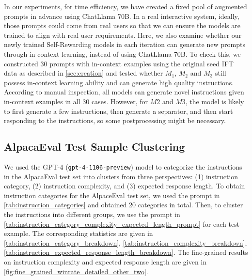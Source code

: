 \documentclass{article}
\begin{document}
In our experiments, for time efficiency, we have created a fixed pool of augmented prompts in advance using ChatLlama 70B. In a real interactive system, ideally, those prompts could come from real users so that we can ensure the models are trained to align with real user requirements. Here, we also examine whether  our newly trained Self-Rewarding models in each iteration can generate new prompts through in-context learning, instead of using ChatLlama 70B.
To check this, we constructed 30 prompts with in-context examples using the original seed IFT data as described in \autoref{sec:creation} and tested whether $M_1$, $M_2$ and $M_3$ still possess in-context learning ability and can generate high quality instructions. According to manual inspection, all models can generate novel instructions given in-context examples in all 30 cases. However, for $M2$ and $M3$, the model is likely to first generate a few instructions, then generate a separator, and then start responding to the instructions, so some postprocessing might be necessary.

\subsection{AlpacaEval Test Sample Clustering}
\label{app:alpacaeval_test_sample_clustering}
We used the GPT-4 (\texttt{gpt-4-1106-preview}) model to categorize the instructions in the AlpacaEval test set into clusters from three perspectives: (1) instruction category, (2) instruction complexity, and (3) expected response length. To obtain instruction categories for the AlpaceEval test set, we used the prompt in \autoref{tab:instruction_categories} and obtained 20 categories in total. Then, to cluster the instructions into different groups, we use the prompt in \autoref{tab:instruction_category_complexity_expected_length_prompt} for each test example. The corresponding statistics are given in \autoref{tab:instruction_category_breakdown}, \autoref{tab:instruction_complexity_breakdown}, \autoref{tab:instruction_expected_response_length_breakdown}. The fine-grained results on instruction complexity and expected response length are given in \autoref{fig:fine_grained_winrate_detailed_other_two}.

\newpage
\end{document}
